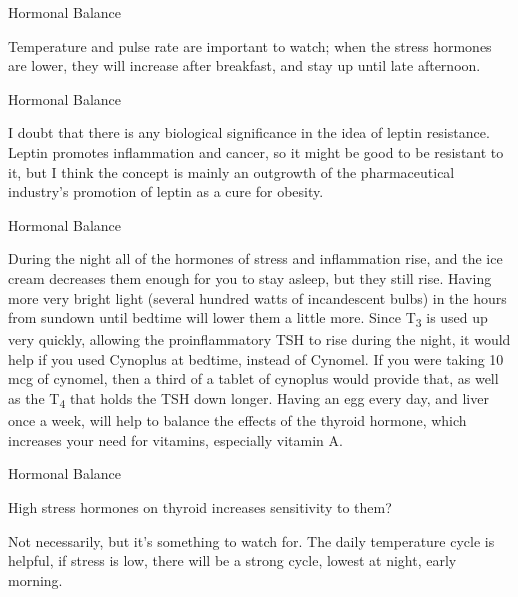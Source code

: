\documentclass[11pt,oneside,openany,extrafontsizes]{memoir}
\begin{document}
\begin{standalonequote}{Hormonal Balance}

    \begin{answer}
        Temperature and pulse rate are important to watch; when the stress hormones are lower, they will increase after breakfast, and stay up until late afternoon.
    \end{answer}
\end{standalonequote}

\begin{standalonequote}{Hormonal Balance}

    \begin{answer}
        I doubt that there is any biological significance in the idea of leptin resistance. Leptin promotes inflammation and cancer, so it might be good to be resistant to it, but I think the concept is mainly an outgrowth of the pharmaceutical industry's promotion of leptin as a cure for obesity.
    \end{answer}
\end{standalonequote}

\begin{standalonequote}{Hormonal Balance}

    \begin{answer}
        During the night all of the hormones of stress and inflammation rise, and the ice cream decreases them enough for you to stay asleep, but they still rise. Having more very bright light (several hundred watts of incandescent bulbs) in the hours from sundown until bedtime will lower them a little more. Since T\textsubscript{3} is used up very quickly, allowing the proinflammatory TSH to rise during the night, it would help if you used Cynoplus at bedtime, instead of Cynomel. If you were taking 10 mcg of cynomel, then a third of a tablet of cynoplus would provide that, as well as the T\textsubscript{4} that holds the TSH down longer. Having an egg every day, and liver once a week, will help to balance the effects of the thyroid hormone, which increases your need for vitamins, especially vitamin A.
    \end{answer}
\end{standalonequote}

\begin{qaexchange}{Hormonal Balance}

    \begin{question}
        High stress hormones on thyroid increases sensitivity to them?
    \end{question}

    \begin{answer}
        Not necessarily, but it's something to watch for. The daily temperature cycle is helpful, if stress is low, there will be a strong cycle, lowest at night, early morning.
    \end{answer}
\end{qaexchange}
\end{document}
